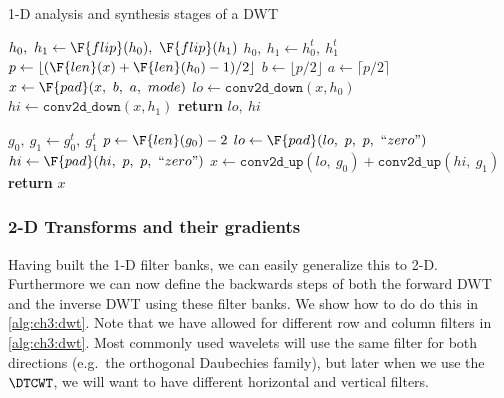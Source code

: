 \begin{algorithm}[tb]
\caption{1-D analysis and synthesis stages of a DWT}\label{alg:ch3:fb1d}
\begin{algorithmic}[1]
  \State $ h_0,\ h_1 \gets \F{flip}(h_0),\ \F{flip}(h_1) $
    \State $h_0,\ h_1 \gets h_0^t,\ h_1^t$  
  \EndIf
  \State $p \gets \lfloor (\F{len}(x) + \F{len}(h_0) - 1) / 2 \rfloor$ 
  \State $b \gets \lfloor p/2 \rfloor$ 
  \State $a \gets \lceil p/2 \rceil$ 
  \State $x \gets \F{pad}(x,\ b,\ a,\ mode)$  
  \State $lo \gets \mathtt{conv2d\_down} (x, h_0)$
  \State $hi \gets \mathtt{conv2d\_down} (x, h_1)$
  \State \textbf{return} $lo,\ hi$
\EndFunction
\end{algorithmic}\vspace{10pt}
\begin{algorithmic}[1]
    \State $g_0,\ g_1 \gets g_0^t,\ g_1^t$  
  \EndIf
  \State $p \gets \F{len}(g_0) - 2$ 
  \State $lo \gets \F{pad}(lo,\ p,\ p,\ ``zero")$  
  \State $hi \gets \F{pad}(hi,\ p,\ p,\ ``zero")$  
  \State $x \gets \mathtt{conv2d\_up}(lo,\ g_0) + \mathtt{conv2d\_up}(hi,\ g_1)$
  \State \textbf{return} $x$
\EndFunction
\end{algorithmic}
\end{algorithm}

\subsubsection{2-D Transforms and their gradients}
Having built the 1-D filter banks, we can easily generalize this to 2-D.
Furthermore we can now define the backwards steps of both the forward DWT
and the inverse DWT using these filter banks. We show how to do do this in 
\autoref{alg:ch3:dwt}. Note that we have allowed for different row and column
filters in \autoref{alg:ch3:dwt}. Most commonly used wavelets will use the same 
filter for both directions (e.g.\ the orthogonal Daubechies family), but later
when we use the $\DTCWT$, we will want to have different horizontal and vertical
filters.

